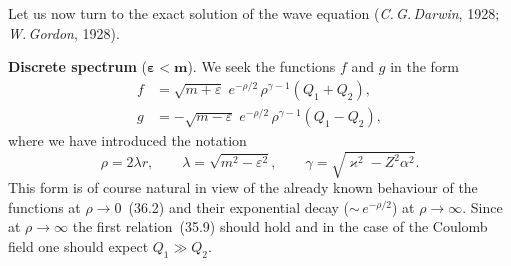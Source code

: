 Let us now turn to the exact solution of the wave equation (\textit{C.\,G.\,Darwin}, 1928; \textit{W.\,Gordon}, 1928).

\medskip
\textbf{Discrete spectrum} ($\boldsymbol{\varepsilon < m}$). We seek the functions $f$ and $g$ in the form
\begin{equation}
\begin{aligned}
f &= \sqrt{m+\varepsilon}\;e^{-\rho/2}\,\rho^{\gamma-1}(Q_1 + Q_2),\\
g &= -\sqrt{m-\varepsilon}\;e^{-\rho/2}\,\rho^{\gamma-1}(Q_1 - Q_2),
\end{aligned}
\tag{36.3}
\end{equation}
where we have introduced the notation
\begin{equation}
\rho = 2\lambda r,\qquad \lambda = \sqrt{m^2 - \varepsilon^2},\qquad \gamma = \sqrt{\varkappa^2 - Z^2\alpha^2}.
\tag{36.4}
\end{equation}
This form is of course natural in view of the already known behaviour of the functions at $\rho \to 0$~(36.2) and their exponential decay (${\sim}\,e^{-\rho/2}$) at $\rho\to\infty$. Since at $\rho\to\infty$ the first relation~(35.9) should hold and in the case of the Coulomb field one should expect $Q_1 \gg Q_2$.

